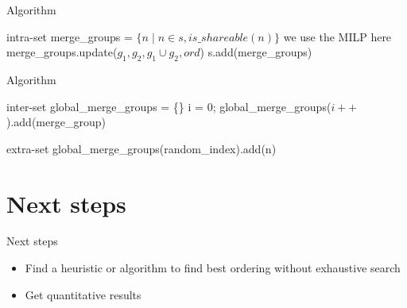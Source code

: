 \documentclass{beamer}
\begin{document}
\begin{frame}[fragile]{Algorithm}
 \small
 \scriptsize
\begin{algorithmic}[1]
    \LineComment intra-set
            \State merge\_groups = $\{ n \mid n \in s, is\_shareable(n)\}$
            \Do
                            \LineComment we use the MILP here
                                \State merge\_groups.update($g_1, g_2, g_1 \cup g_2, ord$) 
                            \EndIf
                        \EndFor
                    \EndIf
                \EndFor
            \State s.add(merge\_groups)
        \EndFor
    \EndFor
\end{algorithmic}
\end{frame}

\begin{frame}[fragile]{Algorithm}
 \small
 \scriptsize
\begin{algorithmic}[1]
    \LineComment inter-set
    \State global\_merge\_groups = \{\}
        \State i = 0;
            \State global\_merge\_groups($i++$).add(merge\_group)
        \EndFor
    \EndFor
    
    \LineComment extra-set
        \State global\_merge\_groups(random\_index).add(n)
    \EndFor
\end{algorithmic}
\end{frame}

\section{Next steps}
\begin{frame}{Next steps}
\begin{itemize}
    \item Find a heuristic or algorithm to find best ordering without exhaustive search
    \item Get quantitative results
\end{itemize}
\end{frame}
\end{document}
